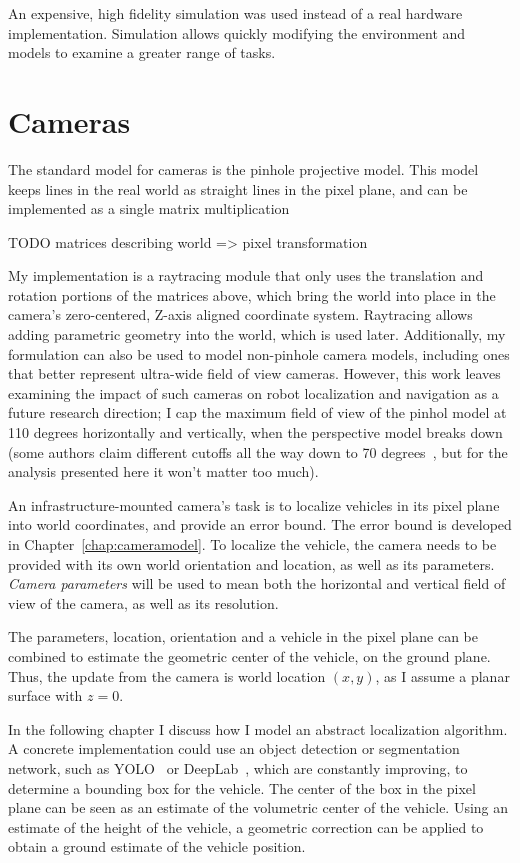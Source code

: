 \documentclass[a4paper,12pt,twoside,openright]{report}
\begin{document}
An expensive, high fidelity simulation was used instead of a real hardware
implementation. Simulation allows quickly modifying the environment
and models to examine a greater range of tasks.


\section{Cameras}
\label{impl:sensors}

The standard model for cameras is the pinhole projective model. This model 
keeps lines in the real world as straight lines in the pixel plane,
and can be implemented as a single matrix multiplication

TODO matrices describing world => pixel transformation

My implementation is a raytracing module that only uses the
translation and rotation portions of the matrices above, which bring the world into place
in the camera's zero-centered, Z-axis aligned coordinate system. Raytracing
allows adding parametric geometry into the world, which is used later.
Additionally, my formulation can also be used to model non-pinhole camera models,
including ones that better represent ultra-wide field of view cameras. However, this work leaves
examining the impact of such cameras on robot localization and navigation as
a future research direction; I cap the maximum field of view of the pinhol model
at 110 degrees horizontally and vertically, when the perspective model
breaks down~\cite{fleckperspective} (some authors claim different cutoffs all the way down
to 70 degrees~\cite{sharpless2010pannini}, but for the analysis presented here it won't 
matter too much). 

An infrastructure-mounted camera's task is to localize vehicles in its pixel plane 
into world coordinates, and provide an error bound. The error bound is developed 
in Chapter~\ref{chap:cameramodel}. To localize the vehicle, the camera needs to
be provided with its own world orientation and location, as well as its parameters.
\textit{Camera parameters} will be used to mean both the horizontal
and vertical field of view of the camera, as well as its resolution. 

The parameters, location, orientation and a vehicle in the pixel plane can be
combined to estimate the geometric center of the vehicle, on the ground plane. Thus,
the update from the camera is world location $(x,y)$, as I assume a planar surface
with $z = 0$.

In the following chapter I discuss how I model an abstract localization algorithm. A 
concrete implementation could use an object detection or segmentation network,
such as YOLO~\cite{redmon2018yolov3} or DeepLab~\cite{chen2017rethinking}, which are constantly
improving, to determine a bounding box for the vehicle. The center of the box in the pixel plane
can be seen as an estimate of the volumetric center of the vehicle. 
Using an estimate of the height of the vehicle, a geometric correction can be applied 
to obtain a ground estimate of the vehicle position. %
\end{document}
